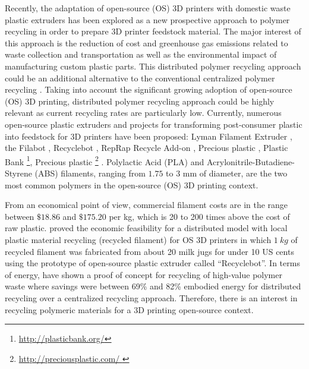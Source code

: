 Recently, the adaptation of open-source (OS) 3D printers with domestic waste plastic extruders has been explored as a new prospective approach to polymer recycling in order to prepare 3D printer feedstock material.
The major interest of this approach is the reduction of cost and greenhouse gas emissions related to  waste collection and transportation as well as the environmental impact of manufacturing custom plastic parts.
This distributed polymer recycling approach could be an additional alternative to the conventional centralized polymer recycling \parencite{Baechler2013, Kreiger2014, Anzalone2013, Kreiger2013,Feeley2014}.
Taking into account the significant growing adoption of open-source (OS) 3D printing, distributed polymer recycling approach could be highly relevant as current recycling rates are particularly low. 
Currently, numerous open-source plastic extruders and projects for transforming post-consumer plastic into feedstock for 3D printers have been proposed: 
Lyman Filament Extruder \parencite{Lyman2014}, the Filabot \parencite{McN2012}, Recyclebot \parencite{Baechler2013}, RepRap Recycle Add-on \parencite{Braanker2010}, Precious plastic \parencite{Hakkens2016}, Plastic Bank \footnote{\hyperlink{http://plasticbank.org/}{http://plasticbank.org/}},  Precious plastic \footnote{\hyperlink{http://preciousplastic.com/ }{http://preciousplastic.com/ }} \parencite{Hakkens2016}. 
Polylactic Acid (PLA) and Acrylonitrile-Butadiene-Styrene (ABS) filaments, ranging from $1.75$ to $3$ mm of diameter, are the two most common polymers in the open-source (OS) 3D printing context.

From an economical point of view, commercial filament costs are in the range between $\$18.86$ and $\$175.20$ per kg, which is 20 to 200 times above the cost of raw plastic. 
\textcite{Wittbrodt2013, Kreiger2014} proved the economic feasibility for a distributed model with local plastic material recycling (recycled filament) for OS 3D printers in which $1~kg$ of recycled filament was fabricated from about 20 milk jugs for under 10 US cents using the prototype of open-source plastic extruder called ``Recyclebot''.
In terms of energy, \textcite{Kreiger2013,Baechler2013} have shown a proof of concept for recycling of high-value polymer waste where savings were between 69\% and 82\% embodied energy for distributed recycling over a centralized recycling approach. 
Therefore, there is an interest in recycling polymeric materials for a 3D printing open-source context.


